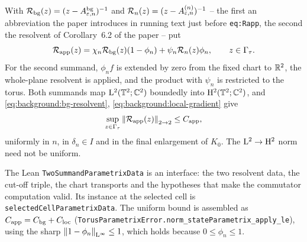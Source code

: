\begin{definition}
  \label{def:transfer:approximate-inverse}
  \leanok
  With $\mathcal{R}_{\rm bg}(z)=(z-A^{\rm bg}_{\varepsilon,n})^{-1}$ and
  $\mathcal{R}_n(z)=(z-A^{(n)}_{\varepsilon,n})^{-1}$ -- the first an abbreviation the paper introduces in
  running text just before \texttt{eq:Rapp}, the second the resolvent of Corollary~6.2 of
  the paper -- put
  \begin{equation}
    \mathcal{R}_{\rm app}(z)=\chi_n\mathcal{R}_{\rm bg}(z)(1-\phi_n)+\psi_n\mathcal{R}_n(z)\phi_n,
    \qquad z\in\Gamma_\tau .
    \label{eq:transfer:Rapp}
  \end{equation}
  For the second summand, $\phi_nf$ is extended by zero from the fixed chart to $\mathbb{R}^2$, the
  whole-plane resolvent is applied, and the product with $\psi_n$ is restricted to the
  torus.  Both summands map $\mathrm{L}^2(\mathbb{T}^2;\mathbb{C}^2)$ boundedly into $\mathrm{H}^2(\mathbb{T}^2;\mathbb{C}^2)$, and
  \eqref{eq:background:bg-resolvent}, \eqref{eq:background:local-gradient} give
  \begin{equation}
    \sup_{z\in\Gamma_\tau}\left\|\mathcal{R}_{\rm app}(z)\right\|_{2\to2}\leq C_{\rm app},
    \label{eq:transfer:parametrix-uniform-bound}
  \end{equation}
  uniformly in $n$, in $\delta_n\in I$ and in the final enlargement of $K_0$.  The
  $\mathrm{L}^2\to\mathrm{H}^2$ norm need not be uniform.
\end{definition}

The Lean \texttt{TwoSummandParametrixData} is an interface: the two resolvent data, the
cut-off triple, the chart transports and the hypotheses that make the commutator
computation valid.  Its instance at the selected cell is
\texttt{selectedCellParametrixData}.  The uniform bound is assembled as
$C_{\rm app}=C_{\rm bg}+C_{\rm loc}$
(\texttt{TorusParametrixError.norm\_stateParametrix\_apply\_le}), using the sharp
$\left\|1-\phi_n\right\|_{\mathrm{L}^\infty}\leq1$, which holds because $0\leq\phi_n\leq1$.

